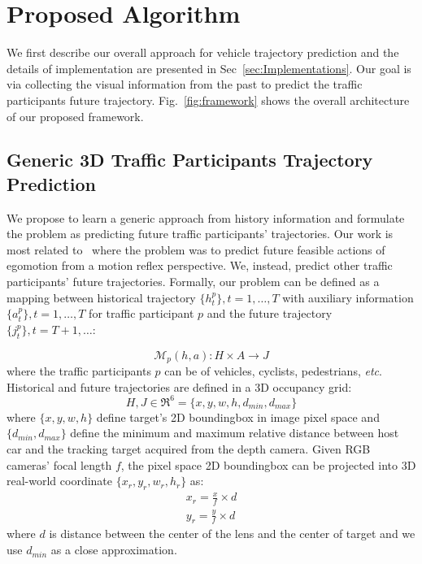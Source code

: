 \documentclass[10pt,twocolumn,letterpaper]{article}
\begin{document}
\section{Proposed Algorithm}

We first describe our overall approach for vehicle trajectory prediction and the details of implementation are presented in Sec~\ref{sec:Implementations}.
Our goal is via collecting the visual information from the past to predict the traffic participants future trajectory. Fig.~\ref{fig:framework} shows the overall architecture of our proposed framework.

\subsection{Generic 3D Traffic Participants Trajectory Prediction}

We propose to learn a generic approach from history information and formulate the problem as predicting future traffic participants' trajectories.
Our work is most related to~\cite{xu2017end} where the problem was to predict future feasible actions of egomotion from a motion reflex perspective.
We, instead,  predict other traffic participants' future trajectories.
Formally, our problem can be defined as a mapping between historical trajectory $ \{h_t^p\}, t=1,\dots, T $ with auxiliary information $ \{a_t^p\}, t=1,\dots, T $ for traffic participant $p$ and the future trajectory $\{j_t^p\}, t={T+1}, \ldots$:

\begin{equation}
\bm{\mathcal{M}}_p(h, a): H \times A  \rightarrow J
\label{eq:mapping}
\end{equation}
where the traffic participants $p$ can be of vehicles, cyclists, pedestrians, \emph{etc}. Historical and future trajectories are defined in a 3D occupancy grid:
\begin{equation}
H, J \in \Re^{6} =  \{x, y, w, h, d_{min}, d_{max}\}
\label{eq:mapping2}
\end{equation}
where $\{x,y,w,h\}$ define target's 2D boundingbox in image pixel space and $\{d_{min}, d_{max}\}$ define the minimum and maximum relative distance between host car and the tracking target acquired from the depth camera. Given RGB cameras' focal length $f$, the pixel space 2D boundingbox can be projected into 3D real-world coordinate $\{x_r,y_r,w_r,h_r\}$ as:
\begin{align}
    x_r = \frac{x}{f} \times d \\
    y_r = \frac{y}{f} \times d
\label{eq:focal_length}
\end{align}
where $d$ is distance between  the center of the lens and the center of target and we use $d_{min}$ as a close approximation.
\end{document}

